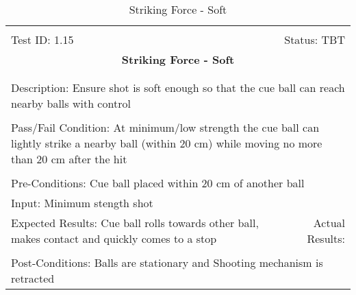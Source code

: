 \documentclass[titlepage]{article}
\begin{document}
\begin{center}%
\begin{table}[h!]
\begin{tabular}{|l r|}\hline&\\[-2mm]
	Test ID: 1.15	&Status: TBT\\[-3mm]
	\multicolumn{2}{|c|}{\textbf{\large{Striking Force - Soft}}}\\&\\\hline&\\[-3mm]
	\multicolumn{2}{|p{\textwidth}|}{Description: Ensure shot is soft enough so that the cue ball can reach nearby balls with control}\\[1mm]\hline&\\[-3mm]
	\multicolumn{2}{|p{\textwidth}|}{Pass/Fail Condition: At minimum/low strength the cue ball can lightly strike a nearby ball (within 20 cm) while moving no more than 20 cm after the hit}\\[1mm]\hline&\\[-3mm]
	\multicolumn{2}{|p{\textwidth}|}{Pre-Conditions: Cue ball placed within 20 cm of another ball}\\[4mm]
	\multicolumn{2}{|p{\textwidth}|}{Input: Minimum stength shot}\\[2mm]\hline
	\multicolumn{1}{|p{0.49\textwidth}}{Expected Results: Cue ball rolls towards other ball, makes contact and quickly comes to a stop}	&\multicolumn{1}{|p{0.45\textwidth}|}{Actual Results:}\\\hline&\\[-3mm]
	\multicolumn{2}{|p{\textwidth}|}{Post-Conditions: Balls are stationary and Shooting mechanism is retracted}\\\hline
\end{tabular}
\caption{Striking Force - Soft}
\end{table}
\end{center}
\end{document}
